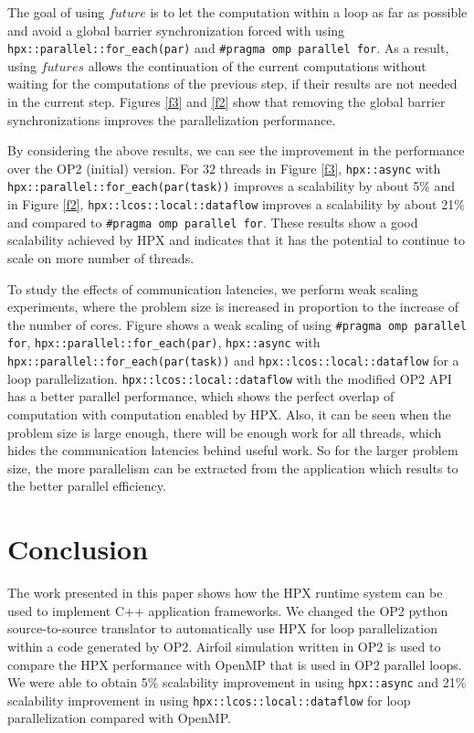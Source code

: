 \documentclass[conference]{IEEEtran}
\begin{document}
The goal of using $future$ is to let the computation within a loop as far as possible and avoid a global barrier synchronization forced with using  \texttt{hpx::parallel::for\_each(par)} and \texttt{\#pragma omp parallel for}. As a result, using $futures$ allows the continuation of the current computations without waiting for the computations of the previous step, if their results are not needed in the current step. Figures \ref{f3} and \ref{f2} show that removing the global barrier synchronizations improves the parallelization performance. 

By considering the above results, we can see the improvement in the performance over the OP2 (initial) version. For $32$ threads in Figure \ref{f3}, \texttt{hpx::async} with \texttt{hpx::parallel::for\_each(par(task))} improves a scalability by about 5\% and in Figure \ref{f2}, \texttt{hpx::lcos::local::dataflow} improves a scalability by about 21\% and compared to \texttt{\#pragma omp parallel for}. These results show a good scalability achieved by HPX and indicates that it has the potential to continue to scale on more number of threads.



To study the effects of communication latencies, we perform weak scaling experiments, where the problem size is increased in proportion to the increase of the number of cores. Figure shows a weak scaling of using \texttt{\#pragma omp parallel for}, \texttt{hpx::parallel::for\_each(par)}, \texttt{hpx::async} with \texttt{hpx::parallel::for\_each(par(task))} and \texttt{hpx::lcos::local::dataflow} for a loop parallelization. \texttt{hpx::lcos::local::dataflow} with the modified OP2 API has a better parallel performance, which shows the perfect overlap of computation with computation enabled by HPX. Also, it can be seen when the problem size is large enough, there will be enough work for all threads, which hides the communication latencies behind useful work. So for the larger problem size, the more parallelism can be extracted from the application which results to the better parallel efficiency. 







\section{Conclusion}
\label{sec:future}

The work presented in this paper shows how the HPX runtime system can be used to implement C++ application frameworks. We changed the OP2 python source-to-source translator to automatically use HPX for loop parallelization within a code generated by OP2. Airfoil simulation written in OP2 is used to compare the HPX performance with OpenMP that is used in OP2 parallel loops. We were able to obtain 5\% scalability improvement in using \texttt{hpx::async} and 21\% scalability improvement in using \texttt{hpx::lcos::local::dataflow} for loop parallelization compared with OpenMP.
\end{document}
